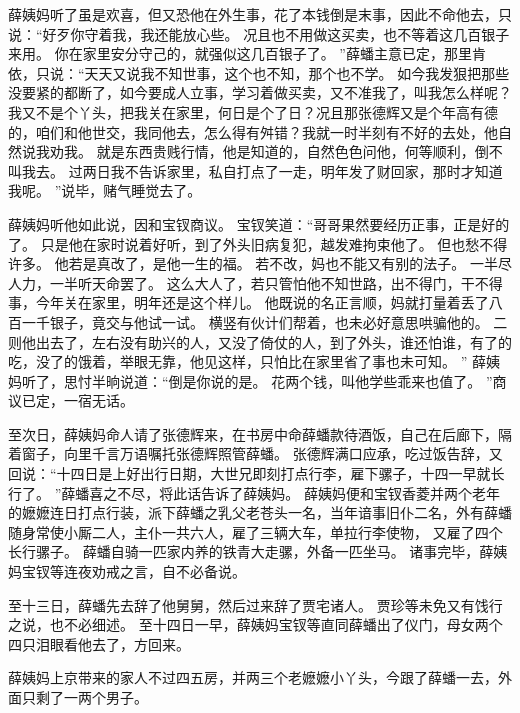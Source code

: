 薛姨妈听了虽是欢喜，但又恐他在外生事，花了本钱倒是末事，因此不命他去，只说：“好歹你守着我，我还能放心些。
况且也不用做这买卖，也不等着这几百银子来用。
你在家里安分守己的，就强似这几百银子了。
”薛蟠主意已定，那里肯依，只说：“天天又说我不知世事，这个也不知，那个也不学。
如今我发狠把那些没要紧的都断了，如今要成人立事，学习着做买卖，又不准我了，叫我怎么样呢？我又不是个丫头，把我关在家里，何日是个了日？况且那张德辉又是个年高有德的，咱们和他世交，我同他去，怎么得有舛错？我就一时半刻有不好的去处，他自然说我劝我。
就是东西贵贱行情，他是知道的，自然色色问他，何等顺利，倒不叫我去。
过两日我不告诉家里，私自打点了一走，明年发了财回家，那时才知道我呢。
”说毕，赌气睡觉去了。
\par
薛姨妈听他如此说，因和宝钗商议。
宝钗笑道：“哥哥果然要经历正事，正是好的了。
只是他在家时说着好听，到了外头旧病复犯，越发难拘束他了。
但也愁不得许多。
他若是真改了，是他一生的福。
若不改，妈也不能又有别的法子。
一半尽人力，一半听天命罢了。
这么大人了，若只管怕他不知世路，出不得门，干不得事，今年关在家里，明年还是这个样儿。
他既说的名正言顺，妈就打量着丢了八百一千银子，竟交与他试一试。
横竖有伙计们帮着，也未必好意思哄骗他的。
二则他出去了，左右没有助兴的人，又没了倚仗的人，到了外头，谁还怕谁，有了的吃，没了的饿着，举眼无靠，他见这样，只怕比在家里省了事也未可知。
”
薛姨妈听了，思忖半晌说道：“倒是你说的是。
花两个钱，叫他学些乖来也值了。
”商议已定，一宿无话。
\par
至次日，薛姨妈命人请了张德辉来，在书房中命薛蟠款待酒饭，自己在后廊下，隔着窗子，向里千言万语嘱托张德辉照管薛蟠。
张德辉满口应承，吃过饭告辞，又回说：“十四日是上好出行日期，大世兄即刻打点行李，雇下骡子，十四一早就长行了。
”薛蟠喜之不尽，将此话告诉了薛姨妈。
薛姨妈便和宝钗香菱并两个老年的嬷嬷连日打点行装，派下薛蟠之乳父老苍头一名，当年谙事旧仆二名，外有薛蟠随身常使小厮二人，主仆一共六人，雇了三辆大车，单拉行李使物，
又雇了四个长行骡子。
薛蟠自骑一匹家内养的铁青大走骡，外备一匹坐马。
诸事完毕，薛姨妈宝钗等连夜劝戒之言，自不必备说。
\par
至十三日，薛蟠先去辞了他舅舅，然后过来辞了贾宅诸人。
贾珍等未免又有饯行之说，也不必细述。
至十四日一早，薛姨妈宝钗等直同薛蟠出了仪门，母女两个四只泪眼看他去了，方回来。
\par
薛姨妈上京带来的家人不过四五房，并两三个老嬷嬷小丫头，今跟了薛蟠一去，外面只剩了一两个男子。
